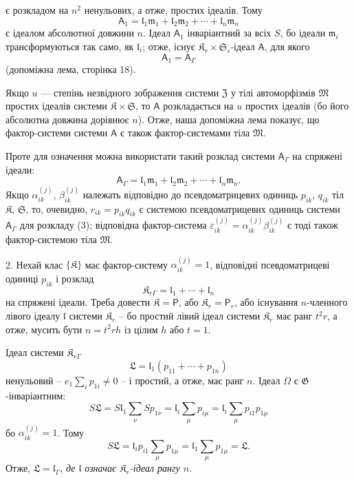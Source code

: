 \documentclass[11pt]{article}
\begin{document}
є розкладом на \(n^2\) ненульових, а отже, простих ідеалів. Тому
\[
\mathsf{A}_1=\mathfrak l_1\mathfrak m_1+\mathfrak l_2\mathfrak m_2+\cdots+\mathfrak l_n\mathfrak m_n
\]
є ідеалом абсолютної довжини \(n\). Ідеал \(\mathsf{A}_1\) інваріантний за всіх \(S\), бо ідеали \(\mathfrak m_i\) трансформуються так само, як \(\mathfrak l_i\); отже, існує \(\mathfrak K_r\times\mathfrak S_s\)-ідеал \(\mathsf{A}\), для якого
\[
\mathsf{A}_1=\mathsf{A}_\Gamma
\]
(допоміжна лема, сторінка 18).

Якщо \(u\) --- степінь незвідного зображення системи \(\mathfrak Z\) у тілі автоморфізмів \(\mathfrak M\) простих ідеалів системи \(\mathfrak K\times\mathfrak S\), то \(\mathsf{A}\) розкладається на \(u\) простих ідеалів (бо його абсолютна довжина дорівнює \(n\)). Отже, наша допоміжна лема показує, що фактор-системи системи \(\mathsf{A}\) є також фактор-системами тіла \(\mathfrak M\).

Проте для означення можна використати такий розклад системи \(\mathsf{A}_\Gamma\) на спряжені ідеали:
\[
\tag{3}
\mathsf{A}_\Gamma=\mathfrak l_1\mathfrak m_1+\mathfrak l_2\mathfrak m_2+\cdots+\mathfrak l_n\mathfrak m_n.
\]
Якщо \(\alpha_{ik}^{(j)}\), \(\beta_{ik}^{(j)}\) належать відповідно до псевдоматрицевих одиниць \(p_{ik}\), \(q_{ik}\) тіл \(\mathfrak K\), \(\mathfrak S\), то, очевидно, \(r_{ik}=p_{ik}q_{ik}\) є системою псевдоматрицевих одиниць системи \(\mathsf{A}_\Gamma\) для розкладу (3); відповідна фактор-система \(\varepsilon_{ik}^{(j)}=\alpha_{ik}^{(j)}\beta_{ik}^{(j)}\) є тоді також фактор-системою тіла \(\mathfrak M\).

2. Нехай клас \(\{\mathfrak K\}\) має фактор-систему \(\alpha_{ik}^{(j)}=1\), відповідні псевдоматрицеві одиниці \(p_{ik}\) і розклад
\[
\mathfrak K_{r\Gamma}=\mathfrak l_1+\cdots+\mathfrak l_n
\]
на спряжені ідеали. Треба довести \(\mathfrak K=\mathsf P\), або \(\mathfrak K_r=\mathsf P_r\), або існування \(n\)-членного лівого ідеалу \(\mathfrak l\) системи \(\mathfrak K_r\) -- бо простий лівий ідеал системи \(\mathfrak K_r\) має ранг \(t^2r\), а отже, мусить бути \(n=t^2rh\) із цілим \(h\) або \(t=1\).

Ідеал системи \(\mathfrak K_{r\Gamma}\)
\[
\mathfrak L=\mathfrak l_1(p_{11}+\cdots+p_{1n})
\]
ненульовий -- \(e_1\sum_i p_{1i}\ne0\) -- і простий, а отже, має ранг \(n\). Ідеал \(\Omega\) є \(\mathfrak G\)-інваріантним:
\[
S\mathfrak L
=S\mathfrak l_1\sum_\nu S p_{1\nu}
=\mathfrak l_i\sum_\mu p_{i\mu}
=\mathfrak l_i\sum_\mu p_{i1}p_{1\mu}
\]
бо \(\alpha_{ik}^{(j)}=1\). Тому
\[
S\mathfrak L=\mathfrak l_ip_{i1}\sum_\mu p_{1\mu}
=\mathfrak l_1\sum_\mu p_{1\mu}
=\mathfrak L.
\]
Отже, \(\mathfrak L=\mathfrak l_\Gamma\), \emph{де \(\mathfrak l\) означає \(\mathfrak K_r\)-ідеал рангу \(n\).}
\end{document}
